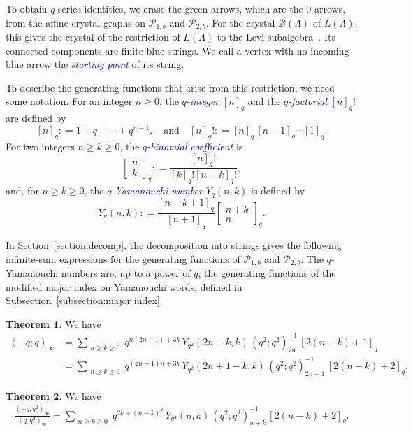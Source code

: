 \documentclass[11pt]{article}
\theoremstyle{definition}
\newtheorem{theorem}{Theorem}[section]
\theoremstyle{remark}
\theoremstyle{definition}
\numberwithin{equation}{section}
\newcommand{\coloneq}{\mathrel{\mathop:}=}
\newcommand\qand{\quad\text{and}\quad}
\renewcommand\emph[1]{\textcolor{darkblue}{\it #1}}
\begin{document}
To obtain $q$-series identities, we erase the green arrows, which are the $0$-arrows, from the affine crystal graphs on $\mathcal{P}_{1,b}$ and $\mathcal{P}_{2,b}$. For the crystal $\mathcal{B}(\Lambda)$ of $L(\Lambda)$, this gives the crystal of the restriction of $L(\Lambda)$ to the Levi subalgebra~\cite[Proposition~4.3]{Kas95}. Its connected components are finite blue strings. We call a vertex with no incoming blue arrow the \emph{starting point} of its string.

To describe the generating functions that arise from this restriction,
we need some notation. For an integer \( n \geq 0 \), the
\emph{$q$-integer} $[n]_q$  and the \emph{$q$-factorial} $[n]_q!$ are defined by
\[
  [n]_q\coloneq 1+q+\cdots+q^{n-1}, \qand [n]_q! \coloneq
  [n]_q\,[n-1]_q\cdots [1]_q.
\]
For two integers $n\geq k\geq0$, the \emph{$q$-binomial coefficient} is 
\[\begin{bmatrix} n \\ k \end{bmatrix}_q \coloneq \frac{[n]_q!}{[k]_q![n-k]_q!},\]
and, for \( n \geq k \geq 0 \), the \emph{$q$-Yamanouchi number} $Y_q(n,k)$ is defined by
\[
Y_q(n,k) \coloneq \frac{[n-k+1]_q}{[n+1]_q}\begin{bmatrix} n+k \\ n \end{bmatrix}_q.
\]

In Section~\ref{section:decomp}, the decomposition into strings gives the following infinite-sum expressions for the generating functions of \( \mathcal{P}_{1,b} \) and \( \mathcal{P}_{2,b} \). The $q$-Yamanouchi numbers are, up to a power of $q$, the generating functions of the modified major index on Yamanouchi words, defined in Subsection~\ref{subsection:major index}.

\begin{theorem}\label{thm:decomp1} We have
\begin{align*}
  (-q;q)_\infty
  &= \sum_{\substack{n\geq k\geq 0}} q^{n(2n-1) + 3k}\, Y_{q^2}(2n-k,k)\,(q^2;q^2)_{2n}^{-1}\,[2(n-k)+1]_q \\
  &= \sum_{\substack{n\geq k\geq 0}} q^{(2n+1)n + 3k}\, Y_{q^2}(2n+1-k,k)\,(q^2;q^2)_{2n+1}^{-1}\,[2(n-k)+2]_q.
\end{align*}
\end{theorem}

\begin{theorem}\label{thm:decomp2} We have
\begin{align*}
\frac{(-q;q^2)_\infty}{(q;q^2)_\infty} = \sum_{\substack{n\geq k\geq 0}}q^{2k+(n-k)^2}\,Y_{q^4}(n,k)\,(q^2;q^2)_{n+k}^{-1}\,[2(n-k)+2]_q.
\end{align*}
\end{theorem}
\end{document}
